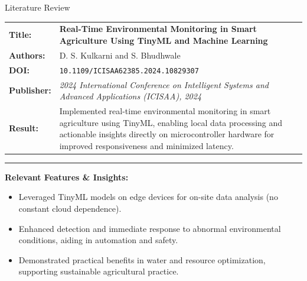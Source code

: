 \documentclass{beamer}
\begin{document}
\begin{frame} {Literature Review}

    \begin{tabularx} {\textwidth} {
            >{\bfseries}m{2.0cm}X
        }

        Title: & \textbf{Real-Time Environmental Monitoring in Smart Agriculture Using TinyML and Machine Learning}
        \\

        Authors: & D. S. Kulkarni and S. Bhudhwale
        \\

        DOI: & \texttt{10.1109/ICISAA62385.2024.10829307}

        \\

        Publisher: & \textit{2024 International Conference on Intelligent Systems and Advanced Applications (ICISAA), 2024} \vfill
        \\

        Result: &
        Implemented real-time environmental monitoring in smart agriculture using TinyML, enabling local data
        processing and actionable insights directly on microcontroller hardware for improved responsiveness and minimized latency.

        \\

    \end{tabularx}

    {\color{leafColorSecondary} \rule{\textwidth}{0.75pt}}

    \textbf{Relevant Features \& Insights:}

    \begin{itemize}

        \item Leveraged TinyML models on edge devices for on-site data analysis (no constant cloud dependence).

        \item Enhanced detection and immediate response to abnormal environmental conditions, aiding in automation and safety.

        \item Demonstrated practical benefits in water and resource optimization, supporting sustainable agricultural practice.

    \end{itemize}

\end{frame}
\end{document}
